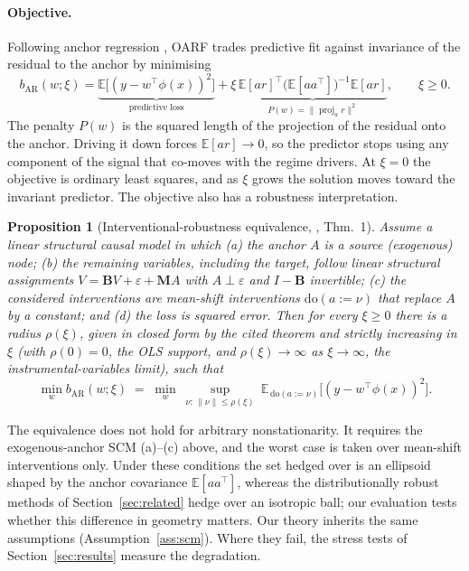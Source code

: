 \documentclass[11pt]{article}
\theoremstyle{plain}
\newtheorem{proposition}{Proposition}
\theoremstyle{remark}
\newcommand{\E}{\mathbb{E}}
\newcommand{\doop}{\mathrm{do}}
\newcommand{\OARF}{\textsc{OARF}}
\DeclareMathOperator{\proj}{proj}
\begin{document}
\paragraph{Objective.}
Following anchor regression \citep{rothenhausler2021anchor}, \OARF{} trades
predictive fit against invariance of the residual to the anchor by minimising
\begin{equation}\label{eq:bar}
b_{\mathrm{AR}}(w;\xi) = \underbrace{\E\!\big[(y-w^\top\phi(x))^2\big]}_{\text{predictive loss}}
 + \xi\,\underbrace{\E[a r]^\top\big(\E[aa^\top]\big)^{-1}\E[a r]}_{P(w)=\|\proj_a r\|^2},
 \qquad \xi\ge 0 .
\end{equation}
The penalty $P(w)$ is the squared length of the projection of the residual onto the
anchor. Driving it down forces $\E[a r]\to 0$, so the predictor stops using any
component of the signal that co-moves with the regime drivers. At $\xi=0$ the
objective is ordinary least squares, and as $\xi$ grows the solution moves toward the
invariant predictor. The objective also has a robustness interpretation.

\begin{proposition}[Interventional-robustness equivalence,
\citealp{rothenhausler2021anchor}, Thm.~1]\label{prop:equiv}
Assume a linear structural causal model in which (a) the anchor $A$ is a
\emph{source} (exogenous) node; (b) the remaining variables, including the target,
follow linear structural assignments $V=\mathbf{B}V+\varepsilon+\mathbf{M}A$ with
$A\perp\varepsilon$ and $I-\mathbf{B}$ invertible; (c) the considered interventions
are mean-shift interventions $\doop(a:=\nu)$ that replace $A$ by a constant; and (d)
the loss is squared error. Then for every $\xi\ge 0$ there is a radius
$\rho(\xi)$, given in closed form by the cited theorem and strictly increasing in
$\xi$ (with $\rho(0)=0$, the OLS support, and $\rho(\xi)\!\to\!\infty$ as
$\xi\!\to\!\infty$, the instrumental-variables limit), such that
\begin{equation}\label{eq:equiv}
\min_w b_{\mathrm{AR}}(w;\xi) \;=\; \min_w\ \sup_{\nu:\,\|\nu\|\le\rho(\xi)}\
 \E_{\,\doop(a:=\nu)}\!\big[(y-w^\top\phi(x))^2\big].
\end{equation}
\end{proposition}
\noindent The equivalence does not hold for arbitrary nonstationarity. It requires the
exogenous-anchor SCM (a)--(c) above, and the worst case is taken over mean-shift
interventions only. Under these conditions the set hedged over is an ellipsoid shaped
by the anchor covariance $\E[aa^\top]$, whereas the distributionally robust methods of
Section~\ref{sec:related} hedge over an isotropic ball; our evaluation tests whether
this difference in geometry matters. Our theory inherits the same assumptions
(Assumption~\ref{ass:scm}). Where they fail, the stress tests of
Section~\ref{sec:results} measure the degradation.
\end{document}
